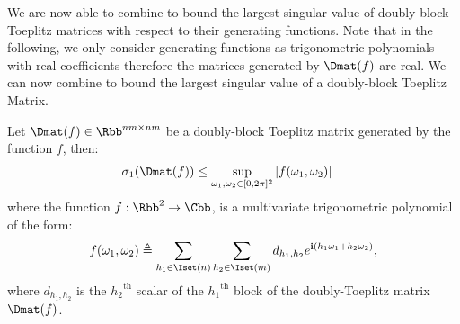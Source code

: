 We are now able to combine  to bound the largest singular value of doubly-block Toeplitz matrices with respect to their generating functions. 
Note that in the following, we only consider generating functions as trigonometric polynomials with real coefficients therefore the matrices generated by $\Dmat(f)$ are real. We can now combine  to bound the largest singular value of a doubly-block Toeplitz Matrix. 

\begin{maintheorem} \label{theorem:doubly_block_teoplitz_sup_singular}
  Let $\Dmat(f) \in \Rbb^{nm \times nm}$ be a doubly-block Toeplitz matrix generated by the function $f$, then:
  \begin{align}
    \sigma_{1} \left( \Dmat(f) \right) &\leq \sup_{\omega_1, \omega_2 \in [0, 2\pi]^2}|f(\omega_1,\omega_2)|
  \end{align}
  where the function $f: \Rbb^2 \rightarrow \Cbb$, is a multivariate trigonometric polynomial of the form:
  \begin{equation}\label{equation:muli_variate_poly_on_M}
    f(\omega_1, \omega_2) \triangleq \sum_{h_1 \in \Iset(n)} \sum_{h_2 \in \Iset(m)} d_{h_1, h_2} e^{\ci (h_1 \omega_1 + h_2 \omega_2)},
  \end{equation}
  where $d_{h_{1},h_{2}}$ is the ${h_2}^\textrm{th}$ scalar of the ${h_1}^\textrm{th}$ block of the doubly-Toeplitz matrix $\Dmat(f)$.
\end{maintheorem}


